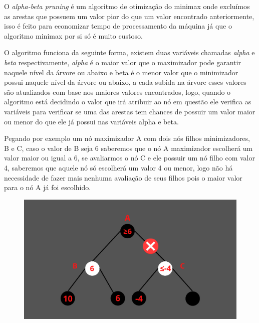 O \textit{alpha-beta pruning} é um algoritmo de otimização do minimax onde excluímos as arestas que possuem um valor
pior do que um valor encontrado anteriormente, isso é feito para economizar tempo de processamento da máquina
já que o algoritmo minimax por si só é muito custoso.

O algoritmo funciona da seguinte forma, existem duas variáveis chamadas \textit{alpha} e \textit{beta} respectivamente,
\textit{alpha} é o maior valor que o maximizador pode garantir naquele nível da árvore ou abaixo e beta é o menor
valor que o minimizador possui naquele nível da árvore ou abaixo, a cada subida na árvore esses valores são
atualizados com base nos maiores valores encontrados, logo, quando o algoritmo está decidindo o valor que irá
atribuir ao nó em questão ele verifica as variáveis para verificar se uma das arestas tem chances de possuir
um valor maior ou menor do que ele já possui nas variáveis alpha e beta.

Pegando por exemplo um nó maximizador A com dois nós filhos minimizadores, B e C,
caso o valor de B seja 6 saberemos que o nó A maximizador escolherá um valor maior ou igual a 6,
se avaliarmos o nó C e ele possuir um nó filho com valor 4, saberemos que aquele nó só escolherá um valor 4
ou menor, logo não há necessidade de fazer mais nenhuma avaliação de seus filhos pois o maior valor para o nó
A já foi escolhido.

\begin{figure}[!ht]
    \centering
    \label{alpha-beta}
    \includegraphics[scale=0.30]{figuras/Inserir_um_pouquinho_de_texto_1.png}
\end{figure}

